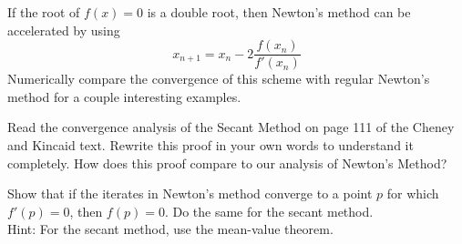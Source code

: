 \documentclass[addpoints, 11pt]{exam}
\begin{document}
\begin{questions}

\pagebreak


\question If the root of $f(x)=0$ is a double root, then Newton's method can be accelerated by using
\[
x_{n+1}=x_n - 2 \frac{f(x_n)}{f'(x_n)}
\]
Numerically compare the convergence of this scheme with regular Newton's method for a couple interesting examples.

\question Read the convergence analysis of the Secant Method on page 111 of the Cheney and Kincaid text. Rewrite this proof in your own words to understand it completely. How does this proof compare to our analysis of Newton's Method?

\question Show that if the iterates in Newton's method converge to a point $p$ for which $f'(p)=0$, then $f(p)=0$. Do the same for the secant method. \\
Hint: For the secant method, use the mean-value theorem.

\end{questions}
\end{document}
